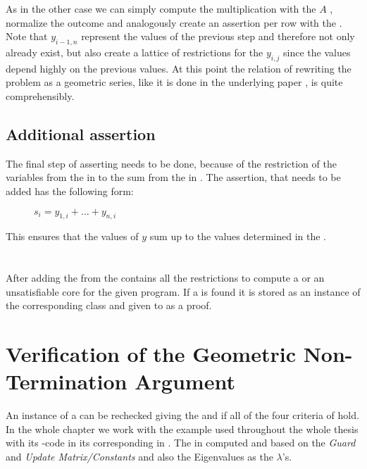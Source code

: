 As in the other case we can simply compute the multiplication with the \updatematrix $A$ , normalize the outcome and analogously create an assertion per row with the \smtfactory. \newline
Note that $y_{i-1,n}$ represent the values of the previous step and therefore not only already exist, but also create a lattice of restrictions for the $y_{i,j}$ since the values depend highly on the previous values. At this point the relation of rewriting the problem as a geometric series, like it is done in the underlying paper \cite{leike2014geometric}, is quite comprehensibly.

\subsection{Additional assertion}
\label{sec:additional-assertion}
The final step of asserting needs to be done, because of the restriction of the variables from the \rayc in  to the sum from the \pointc in .\newline
The assertion, that needs to be added has the following form:
\begin{figure}[H]
	\centering
	$s_i = y_{1,i}+ \dots + y_{n,i}$
\end{figure}
This ensures that the values of $y$ sum up to the values determined in the \pointc.
\\
\\
\\
After adding the \addass from  the \solver contains all the restrictions to compute a \gna or an unsatisfiable core for the given program.\newline
If a \gna is found it is stored as an instance of the corresponding class and given to \aprove as a proof.

\section{Verification of the Geometric Non-Termination Argument}
\label{sec:verification-of-gna}
An instance of a \gna can be rechecked giving the \iterationmatrix and \iterationconstants if all of the four criteria of  hold.
In the whole chapter we work with the example used throughout the whole thesis with its -code in  its corresponding \its in . The in  computed \iterationmatrix and \iterationconstants based on the \textit{Guard} and \textit{Update Matrix/Constants} and also the Eigenvalues as the $\lambda$'s. \newline

